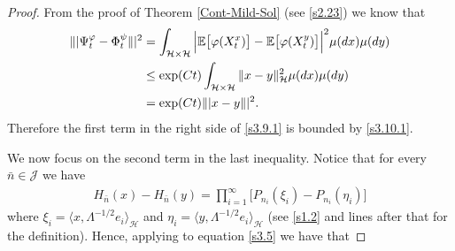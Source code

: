 \documentclass[review, onefignum, onetabnum]{siamart171218}
\begin{document}
\begin{proof}
From the proof of Theorem \ref{Cont-Mild-Sol} (see \eqref{s2.23}) we know that
\begin{equation}
    \begin{aligned}
        \| | \Psi_t^\varphi-\Phi_t^\psi\| |^2
            &=\int_{\mathcal{H}\times \mathcal{H}}
            \Big|
                \E\big [
                    \varphi(X_t^x)
                \big]
                -
                \E\big[
                    \varphi(X_t^y)
                \big]
            \Big|^2
            \mu(dx)
            \mu(dy)
            \\
            &\le
            \exp(Ct)
            \int_{\mathcal{H}\times \mathcal{H}}
                \|x-y\|_{\mathcal{H}}^2
                \mu(dx)\mu(dy)
            \\
            &= \exp(Ct) \|  |x-y\| |^2.\label{s3.10.1}
    \end{aligned}
\end{equation}
Therefore the first term in the right side of \eqref{s3.9.1} is bounded by
\eqref{s3.10.1}.

We now focus on the second term in the last inequality. Notice that for every
$\bar n\in \mathcal{J}$ we have
\begin{align}\label{s3.5}
H_{\bar n}(x)-H_{\bar n}(y)=\prod_{i=1}^\infty
\Big[P_{n_i}(\xi_i)-P_{n_i}(\eta_i)\Big]
 \end{align}
where $\xi_i= \langle x,\Lambda^{-1/2}e_i\rangle_{\mathcal{H}}$ and $\eta_i=
\langle y,\Lambda^{-1/2}e_i\rangle_{\mathcal{H}}$
(see \eqref{s1.2} and lines after that for the definition).
Hence, applying  to equation \eqref{s3.5} we have that


\end{proof}
\end{document}
